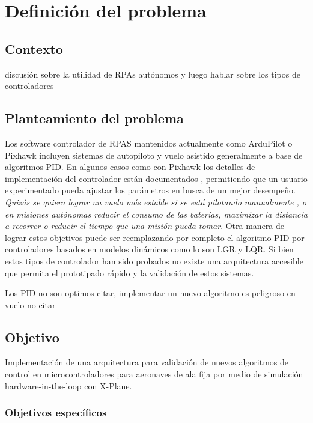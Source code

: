 \chapter{Definición del problema}

\section{Contexto}

discusión sobre la utilidad de RPAs autónomos y luego hablar sobre los tipos de controladores

\section{Planteamiento del problema}

Los software controlador de RPAS mantenidos actualmente como ArduPilot o Pixhawk incluyen sistemas de autopiloto y vuelo asistido generalmente a base de algoritmos PID. En algunos casos como con Pixhawk los detalles de implementación del controlador están documentados \cite{px4-control-diagram}, permitiendo que un usuario experimentado pueda ajustar los parámetros en busca de un mejor desempeño. \emph{Quizás se quiera lograr un vuelo más estable si se está pilotando manualmente \cite{betaflight-pid-tuning}, o en misiones autónomas reducir el consumo de las baterías, maximizar la distancia a recorrer o reducir el tiempo que una misión pueda tomar}. Otra manera de lograr estos objetivos puede ser reemplazando por completo el algoritmo PID por controladores basados en modelos dinámicos como lo son LGR y LQR. Si bien estos tipos de controlador han sido probados \cite{yt-lqr} no existe una arquitectura accesible que permita el prototipado rápido y la validación de estos sistemas.

Los PID no son optimos citar, implementar un nuevo algoritmo es peligroso en vuelo no citar

\section{Objetivo}

Implementación de una arquitectura para validación de nuevos algoritmos de control en microcontroladores para aeronaves de ala fija por medio de simulación hardware-in-the-loop con X-Plane.

\subsection{Objetivos específicos}

